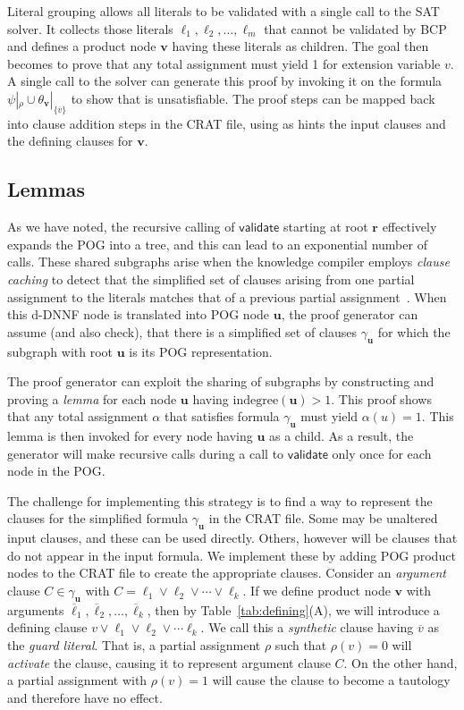 \documentclass[letterpaper,USenglish,cleveref, autoref, thm-restate]{lipics-v2021}
\newcommand{\obar}[1]{\overline{#1}}
\newcommand{\lit}{\ell}
\newcommand{\assign}{\alpha}
\newcommand{\passign}{\rho}
\newcommand{\indegree}{\textrm{indegree}}
\newcommand{\validate}{\textsf{validate}}
\newcommand{\makenode}[1]{\mathbf{#1}}
\newcommand{\nodeu}{\makenode{u}}
\newcommand{\nodev}{\makenode{v}}
\newcommand{\noder}{\makenode{r}}
\newcommand{\simplify}[2]{#1|_{#2}}
\begin{document}
Literal grouping allows all literals to be validated with a single call to the SAT solver.
It collects those literals
$\lit_1, \lit_2, \ldots, \lit_m$ that cannot be validated by BCP and defines a
product node $\nodev$ having these literals as children.  The goal
then becomes to prove that any total assignment must yield 1 for extension
variable $v$.  A single call to the solver can generate this proof by invoking it on the formula
  $\simplify{\psi}{\passign} \cup \simplify{\theta_{\nodev}}{\{ \obar{v} \}}$ to show that is unsatisfiable.
  The proof steps can be mapped back into clause addition steps in the CRAT file, using as hints the
  input clauses and the defining clauses for $\nodev$.


\subsection{Lemmas}
\label{sect:lemma}

As we have noted, the recursive calling of $\validate$ starting at
root $\noder$ effectively expands the POG into a tree, and this can
lead to an exponential number of calls.  
These shared subgraphs arise when the knowledge compiler employs {\em clause caching}
to detect that the simplified set of
clauses arising from one partial assignment to the literals matches that
of a previous partial assignment~\cite{darwiche:aaai:2002}.
When this d-DNNF node is translated into POG
node $\nodeu$, the proof generator can assume (and also check), that
there is a simplified set of clauses $\gamma_{\nodeu}$
for which the subgraph with root $\nodeu$ is its POG representation.

The proof generator can exploit the sharing of subgraphs
by constructing and proving a {\em lemma} for each node
$\nodeu$ having $\indegree(\nodeu) > 1$.  This proof shows that any
total assignment $\assign$ that satisfies formula $\gamma_{\nodeu}$ must yield
$\assign(u) = 1$.  This lemma is then invoked for every node having
$\nodeu$ as a child.  As a result, the generator will make recursive calls during a call to $\validate$ only once for each node in the POG\@.


The challenge for implementing this strategy is to find a way to
represent the clauses for the simplified formula $\gamma_{\nodeu}$ in the CRAT file.  Some may be
unaltered input clauses, and these can be used directly.  Others,
however will be clauses that do not appear in the input formula.  We
implement these by adding POG product nodes to the CRAT file to create
the appropriate clauses.  Consider an {\em argument} clause
$C \in \gamma_{\nodeu}$ with $C = \lit_1 \lor \lit_2 \lor \cdots \lor \lit_k$.  If we
define product node $\nodev$ with arguments
$\obar{\lit}_1, \obar{\lit}_2, \ldots, \obar{\lit}_k$, then by
Table~\ref{tab:defining}(A), we will introduce a defining clause
$v \lor \lit_1 \lor \lit_2 \lor \cdots \lit_k$.  We call this a {\em
  synthetic} clause having $\obar{v}$ as the {\em guard literal}.
That is, a partial assignment $\passign$ such that $\passign(v) = 0$ will {\em
  activate} the clause, causing it to represent argument clause $C$.  On the other
hand, a partial assignment with $\passign(v) = 1$ will
cause the clause to become a tautology and therefore have no effect.
\end{document}

